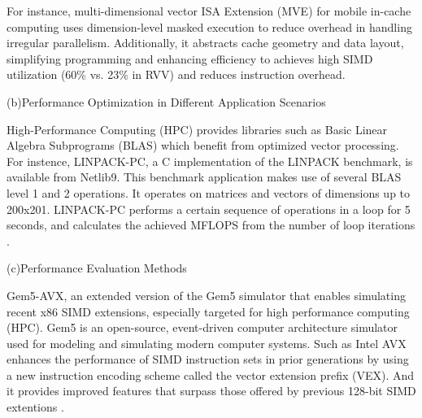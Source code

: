\documentclass[conference]{IEEEtran}
\begin{document}
For instance, multi-dimensional vector ISA Extension (MVE) for mobile in-cache computing uses dimension-level masked execution to reduce overhead in handling irregular parallelism. Additionally, it abstracts cache geometry and data layout, simplifying programming and enhancing efficiency to achieves high SIMD utilization (60\% vs. 23\% in RVV) and reduces instruction overhead.

(b)Performance Optimization in Different Application Scenarios

High-Performance Computing (HPC) provides libraries such as Basic Linear Algebra Subprograms (BLAS) which benefit from optimized vector processing. For instence, LINPACK-PC, a C implementation of the LINPACK benchmark, is available from Netlib9. This benchmark application makes use of several BLAS level 1 and 2 operations. It operates on matrices and vectors of dimensions up to 200x201. LINPACK-PC performs a certain sequence of operations in a loop for 5 seconds, and calculates the achieved MFLOPS from
the number of loop iterations \cite{b8}. 

(c)Performance Evaluation Methods

Gem5-AVX, an extended version of the Gem5 simulator that enables simulating recent x86 SIMD extensions, especially targeted for high performance computing (HPC). Gem5 is an open-source, event-driven computer architecture simulator used for modeling and simulating modern computer systems. Such as Intel AVX enhances the performance of SIMD instruction sets in prior generations by using a new instruction encoding scheme called the vector extension prefix (VEX). And it provides improved features that surpass those offered by previous 128-bit SIMD extentions \cite{b9}.









\end{document}
